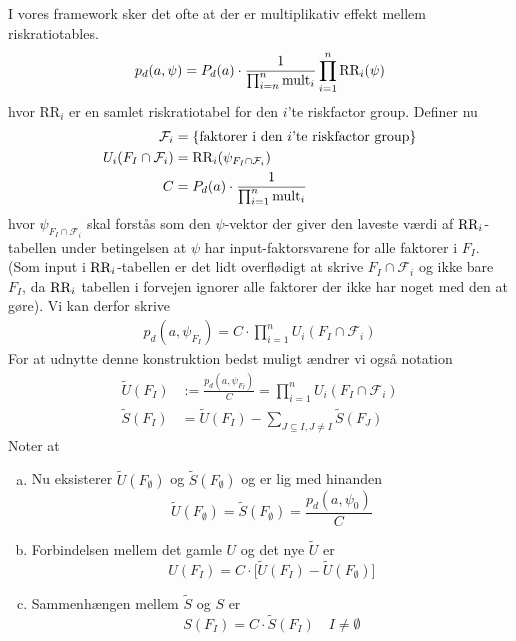 \documentclass[a4paper, 12pt]{article}
\begin{document}
I vores framework sker det ofte at der er multiplikativ effekt mellem riskratiotables.
\begin{equation}
p_d(a,\psi)=P_d(a)\cdot \frac{1}{\prod_{i=n}^n \textup{mult}_i} \prod_{i=1}^n \textup{RR}_i(\psi)\label{multiplicative_groups}
\end{equation}
hvor $\text{RR}_i$ er en samlet riskratiotabel for den $i$'te riskfactor group. Definer nu 
\begin{align}
\mathcal F_i&=\{\textup{faktorer i den $i$'te riskfactor group}\}\\
U_i(F_I\cap \mathcal F_i)&=\textup{RR}_i(\psi_{F_I\cap \mathcal F_i})\\
C&=P_d(a)\cdot \frac{1}{\prod_{i=1}^n \textup{mult}_i} 
\end{align}
hvor $\psi_{F_I \cap \mathcal F_i}$ skal forstås som den $\psi$-vektor der giver den laveste værdi af $\textup{RR}_i$-tabellen under betingelsen at $\psi$ har input-faktorsvarene for alle faktorer i $F_I$. (Som input i $\textup{RR}_i$-tabellen er det lidt overflødigt at skrive $F_I\cap \mathcal F_i$ og ikke bare $F_I$, da $\textup{RR}_i$ tabellen i forvejen ignorer alle faktorer der ikke har noget med den at gøre). Vi kan derfor skrive
\begin{align}
p_d(a,\psi_{F_I})=C\cdot \prod_{i=1}^n U_i(F_I\cap \mathcal F_i)
\end{align}
For at udnytte denne konstruktion bedst muligt ændrer vi også notation 
\begin{align*}
\tilde U(F_I)&:=\frac{p_d(a,\psi_{F_I})}{C}=\prod_{i=1}^nU_i(F_I\cap \mathcal F_i)\\
\tilde S(F_I)&=\tilde U(F_I)-\sum_{J\subseteq I, J\neq I} \tilde S(F_J)
\end{align*}
Noter at 
\begin{enumerate}[a.]
\item
Nu eksisterer $\tilde U(F_{\emptyset})$ og $\tilde S(F_{\emptyset})$ og er lig med hinanden
\begin{equation}
\tilde U(F_{\emptyset})=\tilde S(F_{\emptyset})=\frac{p_d(a,\psi_0)}{C}
\end{equation}
\item
Forbindelsen mellem det gamle $U$ og det nye $\tilde U$ er
\begin{equation}
U(F_I)=C\cdot \bigl[\tilde U(F_I)-\tilde U(F_{\emptyset})\bigr]
\end{equation}
\item
Sammenhængen mellem $\tilde S$ og $S$ er
\begin{equation}
S(F_I)=C\cdot \tilde S(F_I) \quad I\neq \emptyset\label{SStilde}
\end{equation}
\end{enumerate}
\end{document}
